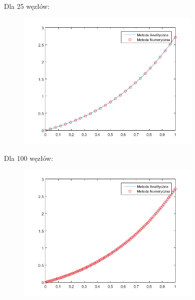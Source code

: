 \begin{samepage}
	Dla 25 węzłów:
	
	\FloatBarrier
	\begin{figure}[!ht]
		\begin{center}
			\includegraphics[width=0.8\textwidth]{Lab4/charts/zad4/c/25.png}
		\end{center}
	\end{figure}
	\FloatBarrier
\end{samepage}

\newpage

\begin{samepage}
	Dla 100 węzłów:
	
	\FloatBarrier
	\begin{figure}[!ht]
		\begin{center}
			\includegraphics[width=0.8\textwidth]{Lab4/charts/zad4/c/100.png}
		\end{center}
	\end{figure}
	\FloatBarrier
\end{samepage}


